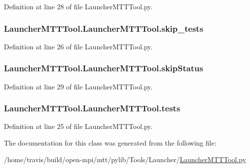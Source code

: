 Definition at line 28 of file Launcher\-M\-T\-T\-Tool.\-py.

\hypertarget{class_launcher_m_t_t_tool_1_1_launcher_m_t_t_tool_a03696ab743c22417d3be183903c20a68}{
\subsubsection[{skip\-\_\-tests}]{\setlength{\rightskip}{0pt plus 5cm}Launcher\-M\-T\-T\-Tool.\-Launcher\-M\-T\-T\-Tool.\-skip\-\_\-tests}}\label{class_launcher_m_t_t_tool_1_1_launcher_m_t_t_tool_a03696ab743c22417d3be183903c20a68}


Definition at line 26 of file Launcher\-M\-T\-T\-Tool.\-py.

\hypertarget{class_launcher_m_t_t_tool_1_1_launcher_m_t_t_tool_a4d5ba97c121703a52364ba25f4a2546b}{
\subsubsection[{skip\-Status}]{\setlength{\rightskip}{0pt plus 5cm}Launcher\-M\-T\-T\-Tool.\-Launcher\-M\-T\-T\-Tool.\-skip\-Status}}\label{class_launcher_m_t_t_tool_1_1_launcher_m_t_t_tool_a4d5ba97c121703a52364ba25f4a2546b}


Definition at line 29 of file Launcher\-M\-T\-T\-Tool.\-py.

\hypertarget{class_launcher_m_t_t_tool_1_1_launcher_m_t_t_tool_a2810a82208a2846540adffee0a6855f7}{
\subsubsection[{tests}]{\setlength{\rightskip}{0pt plus 5cm}Launcher\-M\-T\-T\-Tool.\-Launcher\-M\-T\-T\-Tool.\-tests}}\label{class_launcher_m_t_t_tool_1_1_launcher_m_t_t_tool_a2810a82208a2846540adffee0a6855f7}


Definition at line 25 of file Launcher\-M\-T\-T\-Tool.\-py.



The documentation for this class was generated from the following file\-:\begin{DoxyCompactItemize}
\item 
/home/travis/build/open-\/mpi/mtt/pylib/\-Tools/\-Launcher/\hyperlink{_launcher_m_t_t_tool_8py}{Launcher\-M\-T\-T\-Tool.\-py}\end{DoxyCompactItemize}
